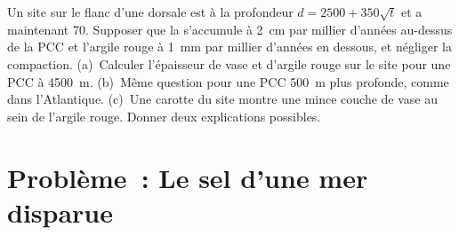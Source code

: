 \begin{exercise}[$\star\star\star$]\label{exo:b1:chemical-biogenic-sediments:12}
Un site sur le flanc d'une dorsale est à la profondeur $d = 2500 + 350\sqrt t$ et a maintenant
\qty{70}{\Ma}. Supposer que la  s'accumule à \qty{2}{cm} par
millier d'années au-dessus de la PCC et l'argile rouge à \qty{1}{mm} par millier d'années
en dessous, et négliger la compaction. (a)~Calculer l'épaisseur de vase et d'argile
rouge sur le site pour une PCC à \qty{4500}{m}. (b)~Même question pour une PCC
\qty{500}{m} plus profonde, comme dans l'Atlantique. (c)~Une carotte du site montre une mince
couche de vase au sein de l'argile rouge. Donner deux explications possibles.
\end{exercise}

\section{Problème~: Le sel d'une mer disparue}

